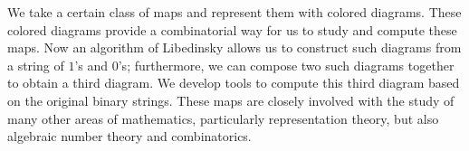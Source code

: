 
We take a certain class of maps and represent them with colored diagrams.  These colored diagrams provide a combinatorial way for us to study and compute these maps.  Now an algorithm of Libedinsky allows us to construct such diagrams from a string of $1$'s and $0$'s; furthermore, we can compose two such diagrams together to obtain a third diagram.   We develop tools to compute this third diagram based on the original binary strings.
These maps are closely involved with the study of many other areas of mathematics, particularly representation theory, but also algebraic number theory and combinatorics.

